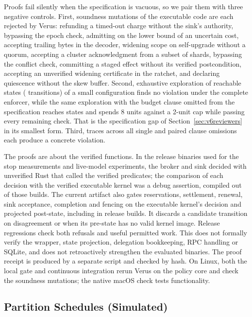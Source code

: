 Proofs fail silently when the specification is vacuous, so we pair them with three negative controls. First,
\VFiveProofMutationsRejected{} soundness mutations of the executable code are each rejected by Verus: refunding a
timed-out charge without the sink's authority, bypassing the epoch check, admitting on the lower bound of an uncertain
cost, accepting trailing bytes in the decoder, widening scope on self-upgrade without a quorum, accepting a cluster
acknowledgment from a subset of shards, bypassing the conflict check, committing a staged effect without its verified
postcondition, accepting an unverified widening certificate in the ratchet, and declaring quiescence without the skew
buffer. Second, exhaustive exploration of \CheckedStates{} reachable states (\CheckedEdges{} transitions) of a small
configuration finds no violation under the complete enforcer, while the same exploration with the budget clause
omitted from the specification reaches \OmittedStates{} states and spends 8 units against a 2-unit cap while passing
every remaining check. That is the specification gap of Section~\ref{sec:v6reviewers} in its smallest form. Third,
\VTwoTraces{} traces across all \VTwoAblationSets{} single and paired clause omissions each produce a concrete
violation.



 The proofs are about the verified functions. In the release
binaries used for the stop measurements and live-model experiments, the broker and sink decided with unverified Rust that called the verified
predicates; the comparison of each decision with the verified executable kernel was a debug assertion, compiled out of
those builds. The current artifact also gates reservations, settlement, renewal, sink acceptance, completion and
fencing on the executable kernel's decision and projected post-state, including in release builds. It discards a
candidate transition on disagreement or when its pre-state has no valid kernel image. Release regressions check
both refusals and useful permitted work. This does not formally verify the wrapper, state projection, delegation
bookkeeping, RPC handling or SQLite, and does not retroactively strengthen the evaluated binaries. The proof
receipt is produced by a separate script and checked by hash. On Linux, both the local gate and continuous integration
rerun Verus on the policy core and check the soundness mutations; the native macOS check tests functionality.

\subsection{Partition Schedules (Simulated)}

